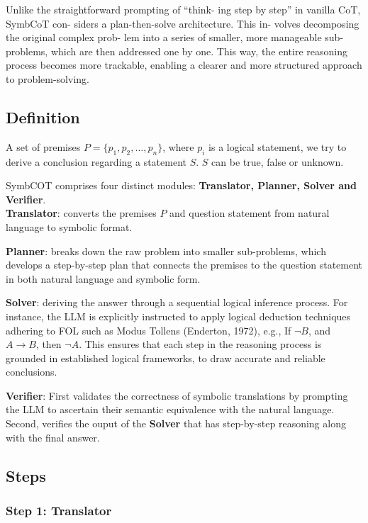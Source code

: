 \documentclass[10pt,a4paper]{article}
\begin{document}
\begin{multicols}{2}
Unlike the straightforward prompting of “think-
ing step by step” in vanilla CoT, SymbCoT con-
siders a plan-then-solve architecture. This in-
volves decomposing the original complex prob-
lem into a series of smaller, more manageable
sub-problems, which are then addressed one
by one. This way, the entire reasoning process
becomes more trackable, enabling a clearer and
more structured approach to problem-solving.

\subsection*{Definition}

A set of premises $P = \{ p_1, p_2, \dots, p_n \}$, where $p_i$ is a logical statement, we try to derive a conclusion regarding a statement $S$. $S$ can be true, false or unknown.

SymbCOT comprises four distinct modules: \textbf{Translator, Planner, Solver and Verifier}.
\\

\textbf{Translator}: converts the premises $P$ and question statement from natural language to symbolic format.

\textbf{Planner}: breaks down the raw problem into smaller sub-problems, which develops a step-by-step plan that connects the premises to the question statement in both natural language and symbolic form.

\textbf{Solver}: deriving the answer through a sequential logical inference process. For instance,
the LLM is explicitly instructed to apply logical
deduction techniques adhering to FOL such as
Modus Tollens (Enderton, 1972), e.g., If $\neg B$, and
$A \rightarrow B$, then $\neg A$. This ensures that each step in
the reasoning process is grounded in established
logical frameworks, to draw accurate and reliable
conclusions.

\textbf{Verifier}: First validates the correctness of symbolic translations by prompting the LLM to ascertain their semantic equivalence with the natural language. Second, verifies the ouput of the \textbf{Solver} that has step-by-step reasoning along with the final answer.

\subsection*{Steps}

\subsubsection*{Step 1: Translator}


\end{multicols}
\end{document}
